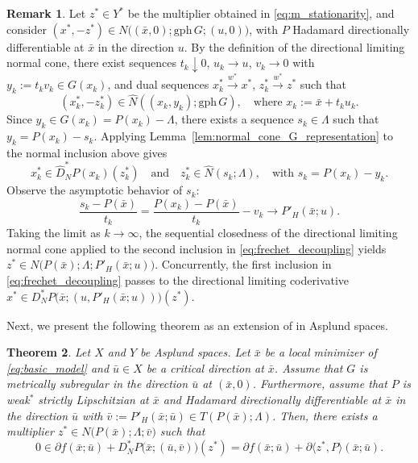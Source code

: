 \documentclass[12pt,twoside,reqno]{amsart}
\newtheorem{theorem}{Theorem}[section]
\theoremstyle{definition}
\newtheorem{remark}[theorem]{Remark}
\numberwithin{equation}{section}
\begin{document}
\begin{remark} \label{rem:optimality_restated} 
    Let $z^* \in Y^*$ be the multiplier obtained in \eqref{eq:m_stationarity}, and consider $(x^*, -z^*) \in N\big((\bar{x}, 0); \mathrm{gph}\, G; (u, 0)\big)$, with $P$ Hadamard directionally differentiable at $\bar{x}$ in the direction $u$. By the definition of the directional limiting normal cone, there exist sequences $t_k \downarrow 0$, $u_k \to u$, $v_k \to 0$ with $y_k := t_k v_k \in G(x_k)$, and dual sequences $x_k^* \xrightarrow{w^*} x^*$, $z_k^* \xrightarrow{w^*} z^*$ such that
    \begin{equation*}
        (x_k^*, -z_k^*) \in \widehat{N}\left((x_k, y_k); \mathrm{gph}\, G\right), \quad \text{where } x_k := \bar{x} + t_k u_k.
    \end{equation*}
    Since $y_k \in G(x_k) = P(x_k) - \Lambda$, there exists a sequence $s_k \in \Lambda$ such that $y_k = P(x_k) - s_k$. Applying Lemma~\ref{lem:normal_cone_G_representation} to the normal inclusion above gives
    \begin{equation} \label{eq:frechet_decoupling}
        x_k^* \in \widehat{D}_N^* P(x_k)(z_k^*) \quad \text{and} \quad z_k^* \in \widehat{N}(s_k; \Lambda), \quad \text{with } s_k = P(x_k) - y_k.
    \end{equation}
    Observe the asymptotic behavior of $s_k$:
    \begin{equation*}
        \frac{s_k - P(\bar{x})}{t_k} = \frac{P(x_k) - P(\bar{x})}{t_k} - v_k \to P'_H(\bar{x}; u).
    \end{equation*}
    Taking the limit as $k \to \infty$, the sequential closedness of the directional limiting normal cone applied to the second inclusion in \eqref{eq:frechet_decoupling} yields $z^* \in N\big(P(\bar{x}); \Lambda; P'_H(\bar{x}; u)\big)$. Concurrently, the first inclusion in \eqref{eq:frechet_decoupling} passes to the directional limiting coderivative $x^* \in D_N^* P\big(\bar{x}; (u, P'_H(\bar{x}; u))\big)(z^*)$. 
\end{remark}

Next, we present the following theorem as an extension of \cite[Theorem~7]{gfrerer2013directional} in Asplund spaces. 

\begin{theorem} \label{thm:further_optimality_mscq}
    Let $X$ and $Y$ be Asplund spaces. Let $\bar{x}$ be a local minimizer of \eqref{eq:basic_model} and $\bar{u} \in X$ be a critical direction at $\bar{x}$. Assume that $G$ is metrically subregular in the direction $\bar{u}$ at $(\bar{x}, 0)$. Furthermore, assume that $P$ is weak\(^*\) strictly Lipschitzian at $\bar{x}$ and Hadamard directionally differentiable at $\bar{x}$ in the direction $\bar{u}$ with $\bar{v} := P'_H(\bar{x}; \bar{u}) \in T(P(\bar{x}); \Lambda)$. Then, there exists a multiplier $z^* \in N\big(P(\bar{x}); \Lambda; \bar{v}\big)$ such that
    \begin{equation} \label{eq:refined_optimality}
        0 \in \partial f(\bar{x}; \bar{u}) + D_N^* P\big(\bar{x}; (\bar{u}, \bar{v})\big)(z^*) = \partial f(\bar{x}; \bar{u}) + \partial \langle z^*, P \rangle (\bar{x}; \bar{u}).
    \end{equation}
\end{theorem}
\end{document}
